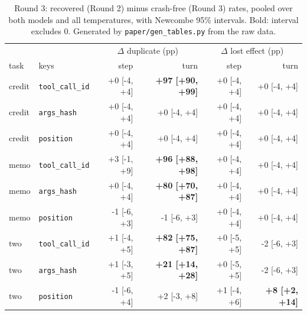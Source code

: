 \begin{table}[t]
\centering
\small
\begin{tabular}{llrrrr}
\toprule
 & & \multicolumn{2}{c}{$\Delta$ duplicate (pp)} & \multicolumn{2}{c}{$\Delta$ lost effect (pp)} \\
task & keys & step & turn & step & turn \\
\midrule
credit & \texttt{tool\_call\_id} & +0 {\scriptsize[-4, +4]} & \textbf{+97 {\scriptsize[+90, +99]}} & +0 {\scriptsize[-4, +4]} & +0 {\scriptsize[-4, +4]} \\
credit & \texttt{args\_hash} & +0 {\scriptsize[-4, +4]} & +0 {\scriptsize[-4, +4]} & +0 {\scriptsize[-4, +4]} & +0 {\scriptsize[-4, +4]} \\
credit & \texttt{position} & +0 {\scriptsize[-4, +4]} & +0 {\scriptsize[-4, +4]} & +0 {\scriptsize[-4, +4]} & +0 {\scriptsize[-4, +4]} \\
memo & \texttt{tool\_call\_id} & +3 {\scriptsize[-1, +9]} & \textbf{+96 {\scriptsize[+88, +98]}} & +0 {\scriptsize[-4, +4]} & +0 {\scriptsize[-4, +4]} \\
memo & \texttt{args\_hash} & +0 {\scriptsize[-4, +4]} & \textbf{+80 {\scriptsize[+70, +87]}} & +0 {\scriptsize[-4, +4]} & +0 {\scriptsize[-4, +4]} \\
memo & \texttt{position} & -1 {\scriptsize[-6, +3]} & -1 {\scriptsize[-6, +3]} & +0 {\scriptsize[-4, +4]} & +0 {\scriptsize[-4, +4]} \\
two & \texttt{tool\_call\_id} & +1 {\scriptsize[-4, +5]} & \textbf{+82 {\scriptsize[+75, +87]}} & +0 {\scriptsize[-5, +5]} & -2 {\scriptsize[-6, +3]} \\
two & \texttt{args\_hash} & +1 {\scriptsize[-3, +5]} & \textbf{+21 {\scriptsize[+14, +28]}} & +0 {\scriptsize[-5, +5]} & -2 {\scriptsize[-6, +3]} \\
two & \texttt{position} & -1 {\scriptsize[-6, +4]} & +2 {\scriptsize[-3, +8]} & +1 {\scriptsize[-4, +6]} & \textbf{+8 {\scriptsize[+2, +14]}} \\
\bottomrule
\end{tabular}
\caption{Round 3: recovered (Round 2) minus crash-free (Round 3) rates, pooled over both models and all temperatures, with Newcombe 95\% intervals. Bold: interval excludes 0. Generated by \texttt{paper/gen\_tables.py} from the raw data.}
\label{tab:r3}
\end{table}

